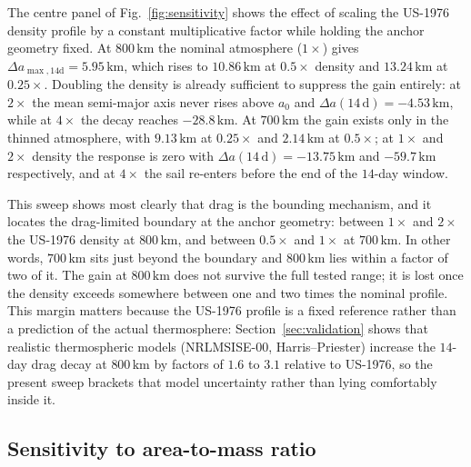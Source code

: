 \noindent The centre panel of Fig.~\ref{fig:sensitivity} shows the effect of scaling the US-1976 density profile by a constant multiplicative factor while holding the anchor geometry fixed. At \(800\,\mathrm{km}\) the nominal atmosphere (\(1\times\)) gives \(\Delta a_{\max,14\mathrm{d}} = 5.95\,\mathrm{km}\), which rises to \(10.86\,\mathrm{km}\) at \(0.5\times\) density and \(13.24\,\mathrm{km}\) at \(0.25\times\). Doubling the density is already sufficient to suppress the gain entirely: at \(2\times\) the mean semi-major axis never rises above \(a_0\) and \(\Delta a(14\,\mathrm{d}) = -4.53\,\mathrm{km}\), while at \(4\times\) the decay reaches \(-28.8\,\mathrm{km}\). At \(700\,\mathrm{km}\) the gain exists only in the thinned atmosphere, with \(9.13\,\mathrm{km}\) at \(0.25\times\) and \(2.14\,\mathrm{km}\) at \(0.5\times\); at \(1\times\) and \(2\times\) density the response is zero with \(\Delta a(14\,\mathrm{d}) = -13.75\,\mathrm{km}\) and \(-59.7\,\mathrm{km}\) respectively, and at \(4\times\) the sail re-enters before the end of the \(14\)-day window.
\vspace{5pt}
\par\noindent This sweep shows most clearly that drag is the bounding mechanism, and it locates the drag-limited boundary at the anchor geometry: between \(1\times\) and \(2\times\) the US-1976 density at \(800\,\mathrm{km}\), and between \(0.5\times\) and \(1\times\) at \(700\,\mathrm{km}\). In other words, \(700\,\mathrm{km}\) sits just beyond the boundary and \(800\,\mathrm{km}\) lies within a factor of two of it. The gain at \(800\,\mathrm{km}\) does not survive the full tested range; it is lost once the density exceeds somewhere between one and two times the nominal profile. This margin matters because the US-1976 profile is a fixed reference rather than a prediction of the actual thermosphere: Section~\ref{sec:validation} shows that realistic thermospheric models (NRLMSISE-00, Harris--Priester) increase the \(14\)-day drag decay at \(800\,\mathrm{km}\) by factors of \(1.6\) to \(3.1\) relative to US-1976, so the present sweep brackets that model uncertainty rather than lying comfortably inside it.

\vspace{5pt}
\subsection{\textbf{Sensitivity to area-to-mass ratio}}

